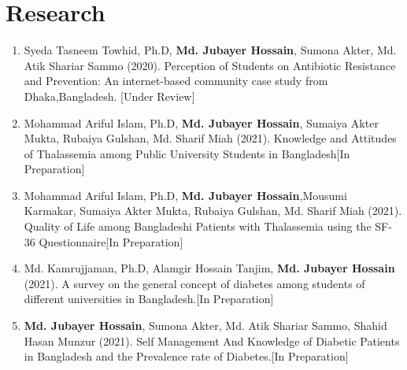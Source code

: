 \documentclass[11pt,a4paper]{moderncv}
\begin{document}
\section{Research}
\begin{enumerate}
	\item Syeda Tasneem Towhid, Ph.D, \textbf{Md. Jubayer Hossain}, Sumona Akter, Md. 
	Atik Shariar Sammo (2020). Perception of Students on Antibiotic Resistance 
	and Prevention: An internet-based community case study from 
	Dhaka,Bangladesh. \hfill [Under Review]
	\item Mohammad Ariful Islam, Ph.D, \textbf{Md. Jubayer Hossain}, Sumaiya Akter Mukta, Rubaiya Gulshan, Md. Sharif Miah (2021). Knowledge and Attitudes of Thalassemia among Public University Students in Bangladesh\hfill [In Preparation]
	\item Mohammad Ariful Islam, Ph.D, \textbf{Md. Jubayer Hossain},Mousumi Karmakar, Sumaiya Akter Mukta, Rubaiya Gulshan, Md. Sharif Miah (2021). Quality of Life among Bangladeshi Patients with Thalassemia using the SF-36 Questionnaire\hfill [In Preparation]
	\item Md. Kamrujjaman, Ph.D, Alamgir Hossain Tanjim, \textbf{Md. Jubayer 
	Hossain} (2021). A survey on the general concept of diabetes among students 
	of different universities in Bangladesh.\hfill [In Preparation]
	\item\textbf{ Md. Jubayer Hossain}, Sumona Akter, Md. Atik Shariar Sammo, 
	Shahid Hasan Munzur (2021). Self Management And Knowledge of Diabetic 
	Patients in Bangladesh and the Prevalence rate of Diabetes.\hfill [In 
	Preparation]
\end{enumerate}


%
\end{document}
